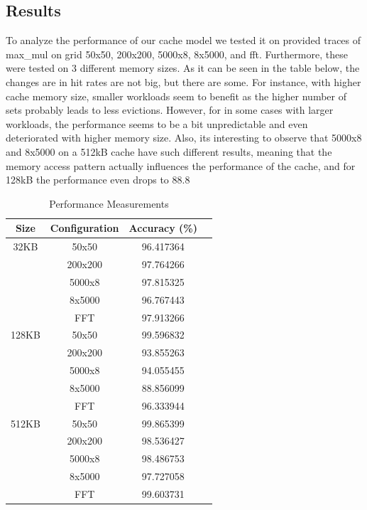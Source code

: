 \subsection{Results}
    To analyze the performance of our cache model we tested it on provided traces of max\_mul on grid 50x50, 200x200, 5000x8, 8x5000, and fft. Furthermore, these were tested on 3 different memory sizes. As it can be seen in the table below, the changes are in hit rates are not big, but there are some. For instance, with higher cache memory size, smaller workloads seem to benefit as the higher number of sets probably leads to less evictions. However, for in some cases with larger workloads, the performance seems to be a bit unpredictable and even deteriorated with higher memory size. Also, its interesting to observe that 5000x8 and 8x5000 on a 512kB cache have such different results, meaning that the memory access pattern actually influences the performance of the cache, and for 128kB the performance even drops to 88.8%

\usepackage{geometry}
\usepackage{booktabs}

\begin{table}[htbp]
  \centering
  \caption{Performance Measurements}
  \begin{tabular}{cccc}
    \toprule
    \textbf{Size} & \textbf{Configuration} & \textbf{Accuracy (\%)} \\
    \midrule
    32KB & 50x50 & 96.417364 \\
         & 200x200 & 97.764266 \\
         & 5000x8 & 97.815325 \\
         & 8x5000 & 96.767443 \\
         & FFT & 97.913266 \\
    \midrule
    128KB & 50x50 & 99.596832 \\
          & 200x200 & 93.855263 \\
          & 5000x8 & 94.055455 \\
          & 8x5000 & 88.856099 \\
          & FFT & 96.333944 \\
    \midrule
    512KB & 50x50 & 99.865399 \\
          & 200x200 & 98.536427 \\
          & 5000x8 & 98.486753 \\
          & 8x5000 & 97.727058 \\
          & FFT & 99.603731 \\
    \bottomrule
  \end{tabular}
\end{table}

